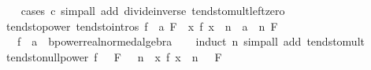 \begin{isabellebody}
%
\isadelimproof
\ \ %
\endisadelimproof
%
\isatagproof
{}\isamarkupfalse%
\ {\isacharparenleft}{\kern0pt}cases\ {\isachardoublequoteopen}c{\isacharequal}{\kern0pt}{}{\isachardoublequoteclose}{\isacharparenright}{\kern0pt}\ {\isacharparenleft}{\kern0pt}simp{\isacharunderscore}{\kern0pt}all\ add{\isacharcolon}{\kern0pt}\ divide{\isacharunderscore}{\kern0pt}inverse\ tendsto{\isacharunderscore}{\kern0pt}mult{\isacharunderscore}{\kern0pt}left{\isacharunderscore}{\kern0pt}zero{\isacharparenright}{\kern0pt}%
\endisatagproof
{\isafoldproof}%
%
\isadelimproof
\isanewline
%
\endisadelimproof
\isanewline
{}\isamarkupfalse%
\ tendsto{\isacharunderscore}{\kern0pt}power\ {\isacharbrackleft}{\kern0pt}tendsto{\isacharunderscore}{\kern0pt}intros{\isacharbrackright}{\kern0pt}{\isacharcolon}{\kern0pt}\ {\isachardoublequoteopen}{\isacharparenleft}{\kern0pt}f\ {\isasymlonglongrightarrow}\ a{\isacharparenright}{\kern0pt}\ F\ {\isasymLongrightarrow}\ {\isacharparenleft}{\kern0pt}{\isacharparenleft}{\kern0pt}{\isasymlambda}x{\isachardot}{\kern0pt}\ f\ x\ {\isacharcircum}{\kern0pt}\ n{\isacharparenright}{\kern0pt}\ {\isasymlonglongrightarrow}\ a\ {\isacharcircum}{\kern0pt}\ n{\isacharparenright}{\kern0pt}\ F{\isachardoublequoteclose}\isanewline
\ \ \ f\ {\isacharcolon}{\kern0pt}{\isacharcolon}{\kern0pt}\ {\isachardoublequoteopen}{\isacharprime}{\kern0pt}a\ {\isasymRightarrow}\ {\isacharprime}{\kern0pt}b{\isacharcolon}{\kern0pt}{\isacharcolon}{\kern0pt}{\isacharbraceleft}{\kern0pt}power{\isacharcomma}{\kern0pt}real{\isacharunderscore}{\kern0pt}normed{\isacharunderscore}{\kern0pt}algebra{\isacharbraceright}{\kern0pt}{\isachardoublequoteclose}\isanewline
%
\isadelimproof
\ \ %
\endisadelimproof
%
\isatagproof
{}\isamarkupfalse%
\ {\isacharparenleft}{\kern0pt}induct\ n{\isacharparenright}{\kern0pt}\ {\isacharparenleft}{\kern0pt}simp{\isacharunderscore}{\kern0pt}all\ add{\isacharcolon}{\kern0pt}\ tendsto{\isacharunderscore}{\kern0pt}mult{\isacharparenright}{\kern0pt}%
\endisatagproof
{\isafoldproof}%
%
\isadelimproof
\isanewline
%
\endisadelimproof
\isanewline
{}\isamarkupfalse%
\ tendsto{\isacharunderscore}{\kern0pt}null{\isacharunderscore}{\kern0pt}power{\isacharcolon}{\kern0pt}\ {\isachardoublequoteopen}{\isasymlbrakk}{\isacharparenleft}{\kern0pt}f\ {\isasymlonglongrightarrow}\ {}{\isacharparenright}{\kern0pt}\ F{\isacharsemicolon}{\kern0pt}\ {}\ {\isacharless}{\kern0pt}\ n{\isasymrbrakk}\ {\isasymLongrightarrow}\ {\isacharparenleft}{\kern0pt}{\isacharparenleft}{\kern0pt}{\isasymlambda}x{\isachardot}{\kern0pt}\ f\ x\ {\isacharcircum}{\kern0pt}\ n{\isacharparenright}{\kern0pt}\ {\isasymlonglongrightarrow}\ {}{\isacharparenright}{\kern0pt}\ F{\isachardoublequoteclose}\isanewline

\end{isabellebody}
